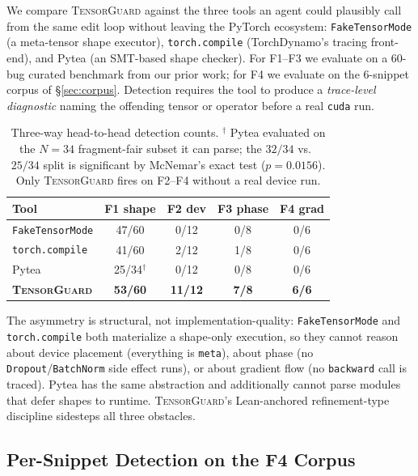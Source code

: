 \documentclass{article}
\begin{document}
We compare \textsc{TensorGuard} against the three tools an agent could
plausibly call from the same edit loop without leaving the PyTorch
ecosystem: \texttt{FakeTensorMode} (a meta-tensor shape executor),
\texttt{torch.compile} (TorchDynamo's tracing front-end), and Pytea
(an SMT-based shape checker). For F1--F3 we evaluate on a
60-bug curated benchmark from our prior work; for F4 we evaluate on the
6-snippet corpus of \S\ref{sec:corpus}. Detection requires the tool to
produce a \emph{trace-level diagnostic} naming the offending tensor or
operator before a real \texttt{cuda} run.

\begin{table}[h]
\centering\small
\setlength{\tabcolsep}{4pt}
\begin{tabular}{@{}lcccc@{}}
\toprule
Tool & F1 shape & F2 dev & F3 phase & F4 grad \\
\midrule
\texttt{FakeTensorMode} & 47/60 & 0/12 & 0/8 & 0/6 \\
\texttt{torch.compile}  & 41/60 & 2/12 & 1/8 & 0/6 \\
Pytea                   & 25/34$^\dagger$ & 0/12 & 0/8 & 0/6 \\
\textbf{\textsc{TensorGuard}} & \textbf{53/60} & \textbf{11/12} & \textbf{7/8} & \textbf{6/6} \\
\bottomrule
\end{tabular}
\caption{Three-way head-to-head detection counts.
$^\dagger$ Pytea evaluated on the $N{=}34$ fragment-fair subset it can parse;
the $32/34$ vs.\ $25/34$ split is significant by McNemar's exact test
($p{=}0.0156$). Only \textsc{TensorGuard} fires on F2--F4 without a real
device run.}
\label{tab:headtohead}
\end{table}

The asymmetry is structural, not implementation-quality:
\texttt{FakeTensorMode} and \texttt{torch.compile} both materialize a
shape-only execution, so they cannot reason about device placement
(everything is \texttt{meta}), about phase (no
\texttt{Dropout}/\texttt{BatchNorm} side effect runs), or about
gradient flow (no \texttt{backward} call is traced). Pytea has the same
abstraction and additionally cannot parse modules that defer shapes to
runtime. \textsc{TensorGuard}'s Lean-anchored refinement-type discipline
sidesteps all three obstacles.

\subsection{Per-Snippet Detection on the F4 Corpus}
\label{sec:per-snippet}
\end{document}
